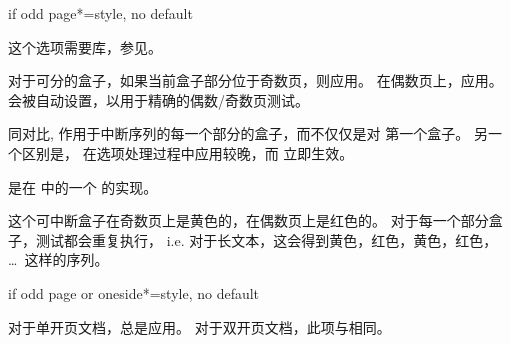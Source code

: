 \begin{docTcbKey}[][doc new=2015-11-13]{if odd page*}{=}{style, no default}
  \begin{marker}
  这个选项需要库，参见。
  \end{marker}
  
  对于可分的盒子，如果当前盒子部分位于奇数页，则应用。%
  在偶数页上，应用。%
  会被自动设置，以用于精确的偶数/奇数页测试。
  
  同对比,  作用于中断序列的每一个部分的盒子，而不仅仅是对
  第一个盒子。%
  另一个区别是，  在选项处理过程中应用较晚，而  立即生效。
  
  
   是在  中的一个  的实现。
  
  \begin{dispExample}
  \begin{tcolorbox}[breakable,if odd page*={colback=yellow!50}{colback=red!50}]
  这个可中断盒子在奇数页上是黄色的，在偶数页上是红色的。%
  对于每一个部分盒子，测试都会重复执行， i.e. 对于长文本，这会得到黄色，红色，黄色，红色， \ldots\ 这样的序列。
  \end{tcolorbox}
  \end{dispExample}
  \end{docTcbKey}

  


\begin{docTcbKey}[][doc new=2016-11-18]{if odd page or oneside*}{=}{style, no default}

对于单开页文档，总是应用。%
对于双开页文档，此项与相同。
\end{docTcbKey}

